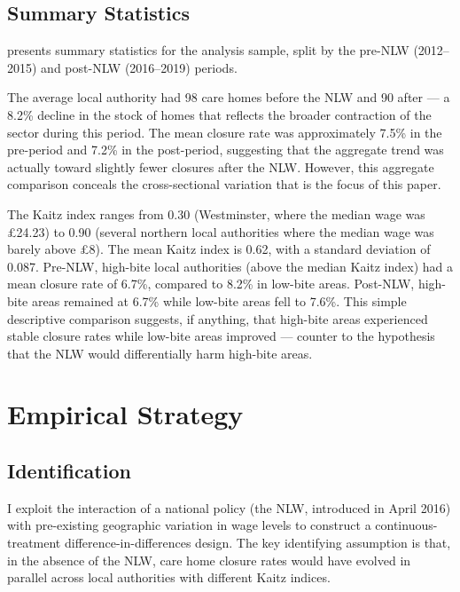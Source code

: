 \documentclass[12pt]{article}
\begin{document}
\subsection{Summary Statistics}

 presents summary statistics for the analysis sample, split by the pre-NLW (2012--2015) and post-NLW (2016--2019) periods.



The average local authority had 98 care homes before the NLW and 90 after --- a 8.2\% decline in the stock of homes that reflects the broader contraction of the sector during this period. The mean closure rate was approximately 7.5\% in the pre-period and 7.2\% in the post-period, suggesting that the aggregate trend was actually toward slightly fewer closures after the NLW. However, this aggregate comparison conceals the cross-sectional variation that is the focus of this paper.

The Kaitz index ranges from 0.30 (Westminster, where the median wage was \pounds24.23) to 0.90 (several northern local authorities where the median wage was barely above \pounds8). The mean Kaitz index is 0.62, with a standard deviation of 0.087. Pre-NLW, high-bite local authorities (above the median Kaitz index) had a mean closure rate of 6.7\%, compared to 8.2\% in low-bite areas. Post-NLW, high-bite areas remained at 6.7\% while low-bite areas fell to 7.6\%. This simple descriptive comparison suggests, if anything, that high-bite areas experienced stable closure rates while low-bite areas improved --- counter to the hypothesis that the NLW would differentially harm high-bite areas.


\section{Empirical Strategy}
\label{sec:strategy}

\subsection{Identification}

I exploit the interaction of a national policy (the NLW, introduced in April 2016) with pre-existing geographic variation in wage levels to construct a continuous-treatment difference-in-differences design. The key identifying assumption is that, in the absence of the NLW, care home closure rates would have evolved in parallel across local authorities with different Kaitz indices.
\end{document}
